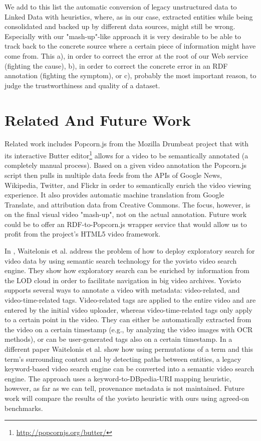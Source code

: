 \documentclass{acm_proc_article-sp}
\begin{document}
We add to this list the automatic conversion of legacy unstructured data to Linked Data with heuristics, where, as in our case, extracted entities while being consolidated and backed up by different data sources, might still be wrong. Especially with our "mash-up"-like approach it is very desirable to be able to track back to the concrete source where a certain piece of information might have come from. This a), in order to correct the error at the root of our Web service (fighting the cause), b), in order to correct the concrete error in an RDF annotation (fighting the symptom), or c), probably the most important reason, to judge the trustworthiness and quality of a dataset.

\section{Related And Future Work}\label{sec:related}
Related work includes Popcorn.js from the Mozilla Drumbeat project\cite{Drumbeat:Popcorn} that with its interactive Butter editor\footnote{\url{http://popcornjs.org/butter/}} allows for a video to be semantically annotated (a completely manual process). Based on a given video annotation the Popcorn.js script then pulls in multiple data feeds from the APIs of Google News, Wikipedia, Twitter, and Flickr in order to semantically enrich the video viewing experience. It also provides automatic machine translation from Google Translate, and attribution data from Creative Commons. The focus, however, is on the final visual video "mash-up", not on the actual annotation. Future work could be to offer an RDF-to-Popcorn.js wrapper service that would allow us to profit from the project's HTML5 video framework.

In \cite{Sack:VideoSearch}, Waitelonis et al. address the problem of how to deploy exploratory search for video data by using semantic search technology for the yovisto video search engine. They show how exploratory search can be enriched by information from the LOD cloud in order to facilitate navigation in big video archives. Yovisto supports several ways to annotate a video with metadata: video-related, and video-time-related tags. Video-related tags are applied to the entire video and are entered by the initial video uploader, whereas video-time-related tags only apply to a certain point in the video. They can either be automatically extracted from the video on a certain timestamp (e.g., by analyzing the video images with OCR methods), or can be user-generated tags also on a certain timestamp. In a different paper \cite{Sack:Use} Waitelonis et al. show how using permutations of a term and this term's surrounding context and by detecting paths between entities, a legacy keyword-based video search engine can be converted into a semantic video search engine. The approach uses a keyword-to-DBpedia-URI mapping heuristic, however, as far as we can tell, provenance metadata is not maintained. Future work will compare the results of the yovisto heuristic with ours using agreed-on benchmarks.
\end{document}

